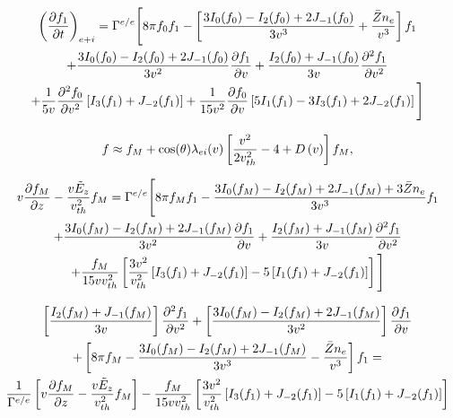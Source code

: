 \documentclass[preprint,12pt]{elsarticle}
\begin{document}
\begin{multline}
  \left(\frac{\partial{f_1}}{\partial{t}}\right)_{e+i} = \Gamma^{e/e}\Bigg[
  8\pi f_0 f_1  
  - \left[\frac{3 I_0(f_0) - I_2(f_0) + 2 J_{-1}(f_0)}{3v^3} +
  \frac{\bar{Z} n_e}{v^3}\right] f_1
  \\
  +   \frac{3 I_0(f_0) -I_2(f_0) + 2 J_{-1}(f_0)}{3v^2}
  \frac{\partial{f_1}}{\partial{v}}
  + \frac{I_2(f_0) + J_{-1}(f_0)}{3v}
  \frac{\partial^2 f_1}{\partial v^2} 
  \\
  + \frac{1}{5 v} \frac{\partial^2 f_0}{\partial v^2}
  \left[I_{3}(f_1) + J_{-2}(f_1)\right]
  + \frac{1}{15 v^2} \frac{\partial{f_0}}{\partial{v}}
  \left[5 I_1(f_1) - 3 I_{3}(f_1) + 2 J_{-2}(f_1) 
  \right] \Bigg]
\end{multline}

\begin{equation}
  f \approx f_M + \cos(\theta) \lambda_{ei}(v) 
  \left[\frac{v^2}{2v_{th}^2} - 4 + D\left(v\right) \right] f_M ,
  \nonumber
\end{equation}

\begin{multline}
  v\frac{\partial{f_M}}{\partial{z}} - \frac{v\tilde{E}_z}{v_{th}^2}f_M = \Gamma^{e/e}\Bigg[
  8\pi f_M f_1  
  - \frac{3 I_0(f_M) - I_2(f_M) + 2 J_{-1}(f_M) + 3 \bar{Z} n_e}{3v^3} f_1
  \\
  +   \frac{3 I_0(f_M) -I_2(f_M) + 2 J_{-1}(f_M)}{3v^2}
  \frac{\partial{f_1}}{\partial{v}}
  + \frac{I_2(f_M) + J_{-1}(f_M)}{3v}
  \frac{\partial^2 f_1}{\partial v^2} 
  \\
  + \frac{f_M}{15 vv_{th}^2} \left[\frac{3v^2}{v_{th}^2}
  \left[I_{3}(f_1) + J_{-2}(f_1)\right]
  - 5 \left[I_1(f_1) + J_{-2}(f_1)\right]
  \right] \Bigg]
  \nonumber
\end{multline}

\begin{multline} 
  \left[\frac{I_2(f_M) + J_{-1}(f_M)}{3v}\right]
  \frac{\partial^2 f_1}{\partial v^2}
  + \left[\frac{3 I_0(f_M) -I_2(f_M) + 2 J_{-1}(f_M)}{3v^2}\right]
  \frac{\partial{f_1}}{\partial{v}}
  \\ 
  + \left[8\pi f_M  - \frac{3 I_0(f_M) - I_2(f_M) + 2 J_{-1}(f_M)}{3v^3}
  - \frac{\bar{Z} n_e}{v^3} \right] f_1 =
  \\
  \frac{1}{\Gamma^{e/e}}
  \left[v\frac{\partial{f_M}}{\partial{z}} - \frac{v\tilde{E}_z}{v_{th}^2}f_M\right]
  - \frac{f_M}{15 vv_{th}^2} \left[\frac{3v^2}{v_{th}^2}
  \left[I_{3}(f_1) + J_{-2}(f_1)\right]
  - 5 \left[I_1(f_1) + J_{-2}(f_1)\right]
  \right]
  \label{eq:FP_f1_diffusive}
\end{multline}
\end{document}
